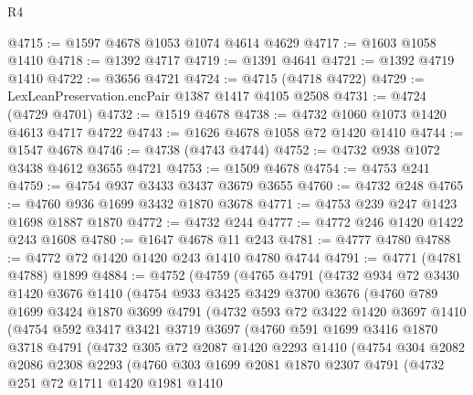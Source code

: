 \begin{lexlean}{R4}
\begin{coremodule}
@4715 := @1597 @4678 @1053 @1074 @4614 @4629
@4717 := @1603 @1058 @1410
@4718 := @1392 @4717
@4719 := @1391 @4641
@4721 := @1392 @4719 @1410
@4722 := @3656 @4721
@4724 := @4715 (@4718 @4722)
@4729 := LexLeanPreservation.encPair @1387 @1417 @4105 @2508
@4731 := @4724 (@4729 @4701)
@4732 := @1519 @4678
@4738 := @4732 @1060 @1073 @1420 @4613 @4717 @4722
@4743 := @1626 @4678 @1058 @72 @1420 @1410
@4744 := @1547 @4678
@4746 := @4738 (@4743 @4744)
@4752 := @4732 @938 @1072 @3438 @4612 @3655 @4721
@4753 := @1509 @4678
@4754 := @4753 @241
@4759 := @4754 @937 @3433 @3437 @3679 @3655
@4760 := @4732 @248
@4765 := @4760 @936 @1699 @3432 @1870 @3678
@4771 := @4753 @239 @247 @1423 @1698 @1887 @1870
@4772 := @4732 @244
@4777 := @4772 @246 @1420 @1422 @243 @1608
@4780 := @1647 @4678 @11 @243
@4781 := @4777 @4780
@4788 := @4772 @72 @1420 @1420 @243 @1410 @4780 @4744
@4791 := @4771 (@4781 @4788) @1899
@4884 := @4752
    (@4759
      (@4765
        @4791
        (@4732
          @934
          @72
          @3430
          @1420
          @3676
          @1410
          (@4754
            @933
            @3425
            @3429
            @3700
            @3676
            (@4760
              @789
              @1699
              @3424
              @1870
              @3699
              @4791
              (@4732
                @593
                @72
                @3422
                @1420
                @3697
                @1410
                (@4754
                  @592
                  @3417
                  @3421
                  @3719
                  @3697
                  (@4760
                    @591
                    @1699
                    @3416
                    @1870
                    @3718
                    @4791
                    (@4732
                      @305
                      @72
                      @2087
                      @1420
                      @2293
                      @1410
                      (@4754
                        @304
                        @2082
                        @2086
                        @2308
                        @2293
                        (@4760
                          @303
                          @1699
                          @2081
                          @1870
                          @2307
                          @4791
                          (@4732
                            @251
                            @72
                            @1711
                            @1420
                            @1981
                            @1410

\end{coremodule}
\end{lexlean}

